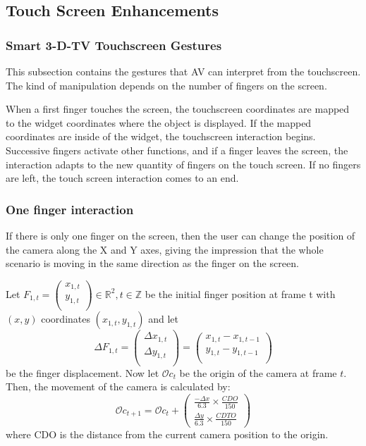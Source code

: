 \documentclass[12pt]{extarticle}
\newcommand{\R}{\mathbb{R}}
\newcommand{\Z}{\mathbb{Z}}
\begin{document}
\subsection {Touch Screen Enhancements}

\subsubsection {Smart 3-D-TV Touchscreen Gestures}
This subsection contains the gestures that AV can interpret from the touchscreen. The kind of manipulation depends on the number of fingers on the screen. 

When a first finger touches the screen, the touchscreen coordinates are mapped to the widget coordinates where the object is displayed. If the mapped coordinates are inside of the widget, the touchscreen interaction begins. Successive fingers activate other functions, and if a finger leaves the screen, the interaction adapts to the new quantity of fingers on the touch screen. If no fingers are left, the touch screen interaction comes to an end.

\subsubsection* {One finger interaction}
If there is only one finger on the screen, then the user can change the position of the camera along the X and Y axes, giving the impression that the whole scenario is moving in the same direction as the finger on the screen.

Let $F_{1,t}=\begin{pmatrix} x_{1,t}\\y_{1,t}\\ \end{pmatrix} \in \R^2, t\in \Z$ be the initial finger position at frame t with $(x,y)$ coordinates $(x_{1,t},y_{1,t})$ and let $$\Delta F_{1,t}=\begin{pmatrix} \Delta x_{1,t}\\\Delta y_{1,t}\\ \end{pmatrix}=\begin{pmatrix} x_{1,t}-x_{1,t-1}\\y_{1,t}-y_{1,t-1}\\ \end{pmatrix}$$ be the finger displacement. Now let $\mathcal Oc_t$ be the origin of the camera at frame $t$. Then, the movement of the camera is calculated by:
$$\mathcal Oc_{t+1}=\mathcal Oc_t+\begin{pmatrix}\frac{-\Delta x }{6.3}\times\frac {CDO}{150}\\\frac{\Delta y }{6.3}\times\frac {CDTO}{150}\end{pmatrix}$$
where CDO is the distance from the current camera position to the origin.
\end{document}

